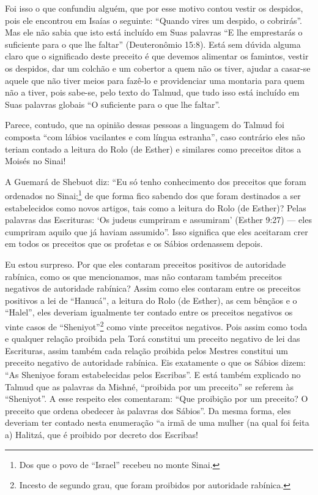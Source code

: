 Foi isso o que confundiu alguém, que por esse motivo contou vestir os
despidos, pois ele encontrou em Isaías o seguinte: ``Quando vires um
despido, o cobrirás''. Mas ele não sabia que isto está incluído em Suas
palavras ``E lhe emprestarás o suficiente para o que lhe faltar''
(Deuteronômio 15:8). Está sem dúvida alguma claro que o significado
deste preceito é que devemos alimentar os famintos, vestir os despidos,
dar um colchão e um cobertor a quem não os tiver, ajudar a casar-se
aquele que não tiver meios para fazê-lo e providenciar uma montaria
para quem não a tiver, pois sabe-se, pelo texto do Talmud, que tudo
isso está incluído em Suas palavras globais ``O suficiente para o que
lhe faltar''.

Parece, contudo, que na opinião dessas pessoas a linguagem do Talmud
foi composta ``com lábios vacilantes e com língua estranha'', caso
contrário eles não teriam contado a leitura do Rolo (de Esther) e
similares como preceitos ditos a Moisés no Sinai!

A Guemará de Shebuot diz: ``Eu só tenho conhecimento dos preceitos que foram ordenados no Sinai;\footnote{Dos que o povo de ``Israel'' recebeu no monte Sinai.} de que forma fico sabendo dos que foram
destinados a ser estabelecidos como novos artigos, tais como a leitura
do Rolo
(de Esther)? Pelas palavras das Escrituras: `Os judeus cumpriram e
assumiram' (Esther 9:27) --- eles cumpriram aquilo que já haviam
assumido''. Isso significa que eles aceitaram crer em todos os preceitos
que os profetas e os Sábios ordenassem depois.

Eu estou surpreso. Por que eles contaram preceitos positivos de
autoridade rabínica, como os que mencionamos, mas não contaram também
preceitos negativos de autoridade rabínica? Assim como eles contaram
entre os preceitos positivos a lei de ``Hanucá'', a leitura do Rolo (de
Esther), as cem bênçãos e o ``Halel'', eles deveriam igualmente ter
contado entre os preceitos negativos os vinte casos de
``Sheniyot''\footnote{Incesto de segundo grau, que foram proibidos por autoridade rabínica.} como vinte preceitos negativos. Pois
assim como toda e qualquer relação proibida pela Torá constitui um
preceito negativo de lei das Escrituras, assim também cada relação
proibida pelos Mestres constitui um preceito negativo de autoridade
rabínica. Eis exatamente o que os Sábios dizem: ``As
Sheniyoe foram estabelecidas pelos Escribas''. E
está também explicado no Talmud que as palavras da Mishné,
``proibida por um preceito'' se referem às ``Sheniyot''. A esse respeito
eles comentaram: ``Que proibição por um preceito? O preceito que ordena
obedecer às palavras dos Sábios''. Da mesma forma, eles deveriam ter
contado nesta enumeração ``a irmã de uma mulher (na qual foi feita a)
Halitzá, que é proibido por decreto dos Escribas!

